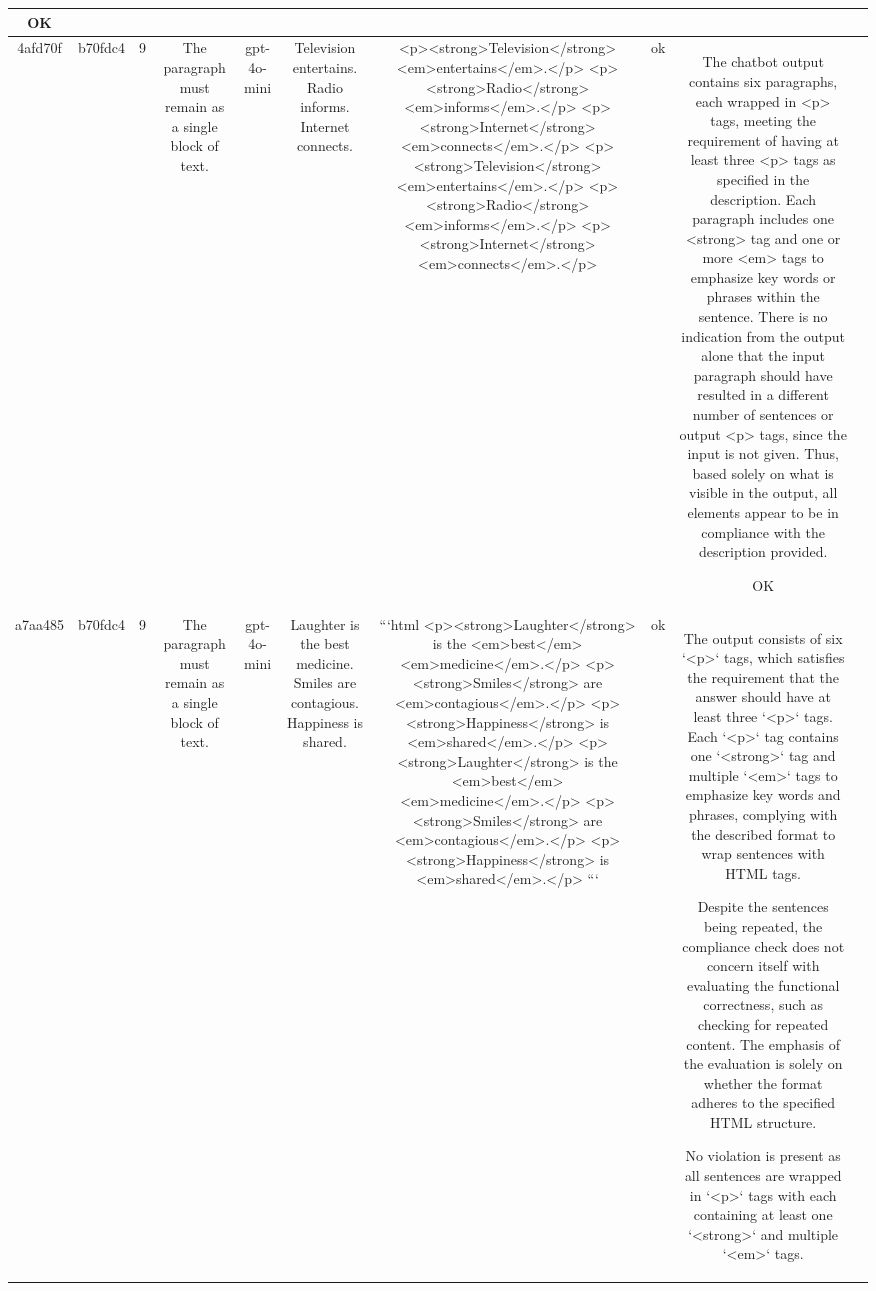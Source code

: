 \begin{table}[h!]
\begin{tabular}{|c|c|c|c|c|c|c|c|c|c|}
OK & \\
\hline
4afd70f & b70fdc4 & 9 & The paragraph must remain as a single block of text. & gpt-4o-mini & Television entertains. Radio informs. Internet connects. & <p><strong>Television</strong> <em>entertains</em>.</p>
<p><strong>Radio</strong> <em>informs</em>.</p>
<p><strong>Internet</strong> <em>connects</em>.</p>
<p><strong>Television</strong> <em>entertains</em>.</p>
<p><strong>Radio</strong> <em>informs</em>.</p>
<p><strong>Internet</strong> <em>connects</em>.</p> & ok & The chatbot output contains six paragraphs, each wrapped in <p> tags, meeting the requirement of having at least three <p> tags as specified in the description. Each paragraph includes one <strong> tag and one or more <em> tags to emphasize key words or phrases within the sentence. There is no indication from the output alone that the input paragraph should have resulted in a different number of sentences or output <p> tags, since the input is not given. Thus, based solely on what is visible in the output, all elements appear to be in compliance with the description provided.

OK & \\
\hline
a7aa485 & b70fdc4 & 9 & The paragraph must remain as a single block of text. & gpt-4o-mini & Laughter is the best medicine. Smiles are contagious. Happiness is shared. & ```html
<p><strong>Laughter</strong> is the <em>best</em> <em>medicine</em>.</p>
<p><strong>Smiles</strong> are <em>contagious</em>.</p>
<p><strong>Happiness</strong> is <em>shared</em>.</p>
<p><strong>Laughter</strong> is the <em>best</em> <em>medicine</em>.</p>
<p><strong>Smiles</strong> are <em>contagious</em>.</p>
<p><strong>Happiness</strong> is <em>shared</em>.</p>
``` & ok & The output consists of six `<p>` tags, which satisfies the requirement that the answer should have at least three `<p>` tags. Each `<p>` tag contains one `<strong>` tag and multiple `<em>` tags to emphasize key words and phrases, complying with the described format to wrap sentences with HTML tags.

Despite the sentences being repeated, the compliance check does not concern itself with evaluating the functional correctness, such as checking for repeated content. The emphasis of the evaluation is solely on whether the format adheres to the specified HTML structure. 

No violation is present as all sentences are wrapped in `<p>` tags with each containing at least one `<strong>` and multiple `<em>` tags.


\end{tabular}
\end{table}
